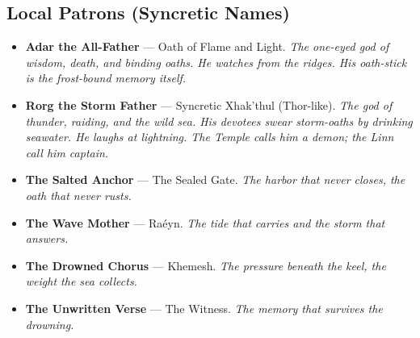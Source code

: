 \subsection*{Local Patrons (Syncretic Names)}
\begin{itemize}
    \item \textbf{Adar the All-Father} --- Oath of Flame and Light. \textit{The one-eyed god of wisdom, death, and binding oaths. He watches from the ridges. His oath-stick is the frost-bound memory itself.}
    \item \textbf{Rorg the Storm Father} --- Syncretic Xhak'thul (Thor-like). \textit{The god of thunder, raiding, and the wild sea. His devotees swear storm-oaths by drinking seawater. He laughs at lightning. The Temple calls him a demon; the Linn call him captain.}
    \item \textbf{The Salted Anchor} --- The Sealed Gate. \textit{The harbor that never closes, the oath that never rusts.}
    \item \textbf{The Wave Mother} --- Ra\'{e}yn. \textit{The tide that carries and the storm that answers.}
    \item \textbf{The Drowned Chorus} --- Khemesh. \textit{The pressure beneath the keel, the weight the sea collects.}
    \item \textbf{The Unwritten Verse} --- The Witness. \textit{The memory that survives the drowning.}
\end{itemize}

